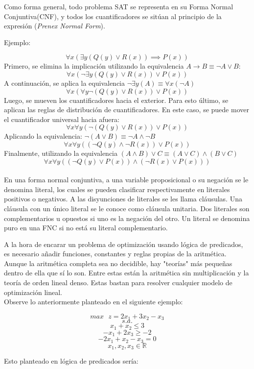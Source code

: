 \documentclass[12pt]{report}
\begin{document}
Como forma general, todo problema SAT se representa en su Forma Normal Conjuntiva(CNF), y todos los cuantificadores se sitúan al principio de la expresión (\textit{Prenex Normal Form}).

Ejemplo:

$$\forall x(\exists y(Q(y)\lor R(x))\implies P(x))$$
Primero, se elimina la implicación utilizando la equivalencia $A→B\equiv \neg A\lor B$:
$$\forall x(\neg\exists y(Q(y)\lor R(x)) \lor  P(x))$$
A continuación, se aplica la equivalencia $\neg\exists y(A)\equiv \forall x(\neg A)$
$$\forall x(\forall y\neg(Q(y)\lor R(x)) \lor  P(x))$$
Luego, se mueven los cuantificadores hacia el exterior. Para esto último, se aplican las reglas de distribución de cuantificadores. En este caso, se puede mover el cuantificador universal hacia afuera:
$$\forall x\forall y(\neg(Q(y)\lor R(x))\lor  P(x))$$
Aplicando la equivalencia: $\neg(A\lor B)\equiv \neg A\land\neg B$
$$\forall x\forall y((\neg Q(y)\land\neg R(x))\lor  P(x))$$
Finalmente, utilizando la equivalencia $(A\land B)\lor C\equiv (A\lor C)\land(B\lor C)$
$$\forall x\forall y((\neg Q(y)\lor  P(x))\land(\neg R(x)\lor  P(x)))$$\\

En una forma normal conjuntiva, a una variable proposicional o su negación se le denomina literal, los cuales se pueden clasificar respectivamente en literales positivos o negativos. A las disyunciones de literales se les llama cláusulas. Una cláusula con un único literal se le conoce como cláusula unitaria. Dos literales son complementarios u opuestos si uno es la negación del otro. Un literal se denomina puro en una FNC si no está su literal complementario.

A la hora de encarar un problema de optimización usando lógica de predicados, es necesario añadir funciones, constantes y reglas propias de la aritmética. Aunque la aritmética completa sea no decidible, hay "teorías" más pequeñas dentro de ella que sí lo son. Entre estas están la aritmética sin multiplicación y la teoría de orden lineal denso. Estas bastan para resolver cualquier modelo de optimización lineal.\\

Observe lo anteriormente planteado en el siguiente ejemplo:

$$max \text{ }z= 2x_1 + 3x_2 - x_3 $$
$$s.a.$$
$$ x_1 + x_2 \leq  3 $$
$$ -x_1 + 2x_3 \geq  -2 $$
$$ -2x_1 + x_2 - x_3 = 0 $$
$$ x_1, x_2, x_3 \in \mathbb{R}  $$

Esto planteado en lógica de predicados sería:
\end{document}
